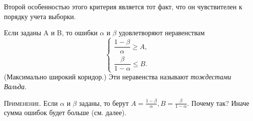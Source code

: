 \begin{remark*}
Второй особенностью этого критерия является тот факт, что он чувствителен к порядку
учета выборки.
\end{remark*}

\begin{theorem}[Вальда]
  Если заданы A и B, то ошибки $\alpha$ и $\beta$ удовлетворяют неравенствам
  \begin{equation*}
    \begin{cases}
      \dfrac{1 - \beta}{\alpha} \geqslant A, \\[1em]
      \dfrac{\beta}{1 - \alpha} \leqslant B.
    \end{cases}
  \end{equation*}
  (Максимально широкий коридор.)
  Эти неравенства называют \emph{тождестами Вальда}.

\end{theorem}

\textsc{Применение.} Если $\alpha$ и $\beta$ заданы, то берут $A =
\frac{1-\beta}{\alpha}, B = \frac{\beta}{1 - \alpha}$.
Почему так? Иначе сумма ошибок будет больше (см. далее).

